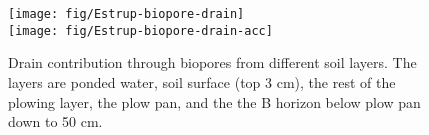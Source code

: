 \begin{figure}[htbp]
  \begin{center}
    \texttt{[image: fig/Estrup-biopore-drain]}\\
    \texttt{[image: fig/Estrup-biopore-drain-acc]}
  \end{center}
  \caption{Drain contribution through biopores from different soil
    layers.  The layers are ponded water, soil surface (top 3 cm), the
    rest of the plowing layer, the plow pan, and the the B horizon
    below plow pan down to 50 cm.}
  \label{fig:Estrup-biopore-drain}
\end{figure}\FloatBarrier
